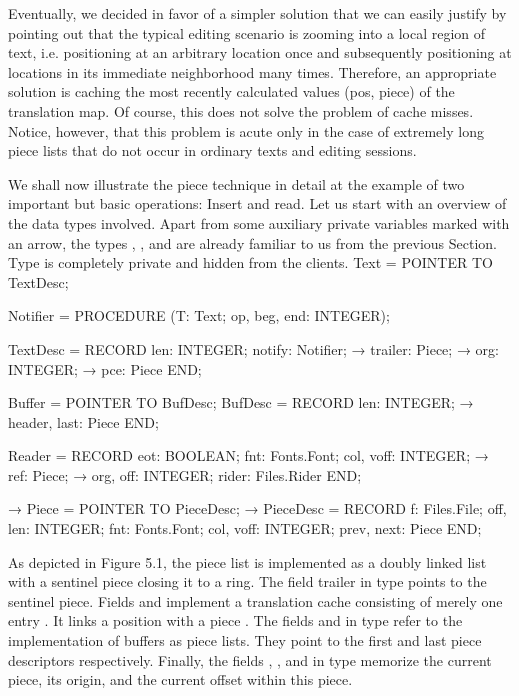 Eventually, we decided in favor of a simpler solution that we can easily justify by pointing out that the typical editing scenario is zooming into a local region of text, i.e. positioning at an arbitrary location once and subsequently positioning at locations in its immediate neighborhood many times. Therefore, an appropriate solution is caching the most recently calculated values (pos, piece) of the translation map. Of course, this does not solve the problem of cache misses. Notice, however, that this problem is acute only in the case of extremely long piece lists that do not occur in ordinary texts and editing sessions.

We shall now illustrate the piece technique in detail at the example of two important but basic operations: Insert and read. Let us start with an overview of the data types involved. Apart from some auxiliary private variables marked with an arrow, the types , , and  are already familiar to us from the previous Section. Type  is completely private and hidden from the clients.
\begintt
Text = POINTER TO TextDesc;

Notifier = PROCEDURE (T: Text; op, beg, end: INTEGER);

TextDesc = RECORD
  len: INTEGER;
  notify: Notifier;
  → trailer: Piece;
  → org: INTEGER;
  → pce: Piece
END;

Buffer = POINTER TO BufDesc;
BufDesc = RECORD
  len: INTEGER;
  → header, last: Piece
END;

Reader = RECORD
  eot: BOOLEAN;
  fnt: Fonts.Font;
  col, voff: INTEGER;
  → ref: Piece;
  → org, off: INTEGER;
  rider: Files.Rider
END;

→ Piece = POINTER TO PieceDesc;
→ PieceDesc = RECORD
  f: Files.File;
  off, len: INTEGER;
  fnt: Fonts.Font;
  col, voff: INTEGER;
  prev, next: Piece
END;
\endtt

\noindent As depicted in Figure 5.1, the piece list is implemented as a doubly
linked list with a sentinel piece closing it to a ring. The field
trailer in type  points to the sentinel piece. Fields  and
 implement a translation cache consisting of merely one entry .
It links a position  with a piece . The fields  and  in type  refer to the implementation of buffers as piece
lists. They point to the first and last piece descriptors
respectively. Finally, the fields , , and  in type 
memorize the current piece, its origin, and the current offset within
this piece.

